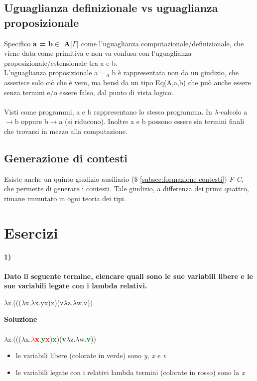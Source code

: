\subsection{Uguaglianza definizionale vs uguaglianza proposizionale}
\label{subsec:uguaglianza-computazionale-proposizionale}
Specifico \textbf{a = b$\in$ A[$\Gamma$]} come l'uguaglianza computazionale/definizionale, che viene data come primitiva e non va confusa con l'uguaglianza proposizionale/estensionale tra a e b.\\L'uguaglianza proposizionale a =$_A$ b \`e rappresentata non da un giudizio, che asserisce solo ci\`o che \`e vero, ma bens\`i da un tipo Eq(A,a,b) che pu\`o anche essere senza termini e/o essere falso, dal punto di vista logico.\\\\
Visti come programmi, a e b rappresentano lo stesso programma. In $\lambda$-calcolo a$\rightarrow$b oppure b$\rightarrow$a (si riducono). Inoltre a e b possono essere sia termini finali che trovarsi in mezzo alla computazione.
\subsection{Generazione di contesti}
\label{subsec:generazione-di-contesti}
Esiste anche un quinto giudizio ausiliario (\$ \ref{subsec:formazione-contesti}) \textit{F-C}, che permette di generare i contesti. Tale giudizio, a differenza dei primi quattro, rimane immutato in ogni teoria dei tipi.

\section{Esercizi}
\label{subsec: lambda-calcolo-puro}
\paragraph{1)} 
\textbf{Dato il seguente termine, elencare quali sono le sue variabili libere e le sue variabili legate con i lambda relativi.}
\begin{center}$\lambda$z.((($\lambda$x.$\lambda$x.yx)x)(v$\lambda$z.$\lambda$w.v))\end{center}
\textbf{Soluzione}\\\\
$\lambda$z.((($\lambda$x.\textbf{\textcolor{red}{$\lambda$x}}.\textbf{\textcolor{green}{y}\textcolor{red}{x}})\textbf{\textcolor{green}{x}})(\textbf{\textcolor{green}{v}}$\lambda$z.$\lambda$w.\textbf{\textcolor{green}{v}}))
\begin{itemize}
\item le variabili libere (colorate in verde) sono \textit{y, x} e \textit{v}
\item le variabili legate con i relativi lambda termini (colorate in rosso) sono la \textit{x}
\end{itemize}

